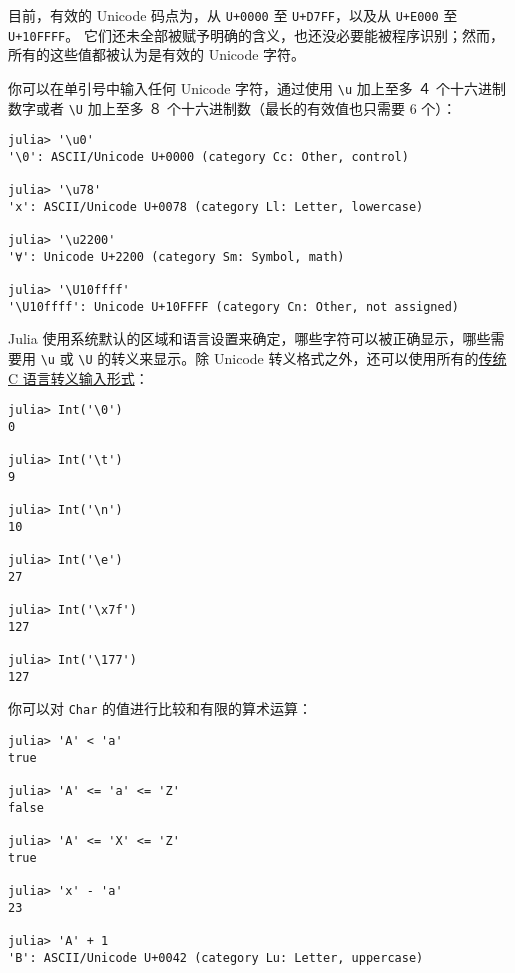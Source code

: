目前，有效的 Unicode 码点为，从 \texttt{U+0000} 至 \texttt{U+D7FF}，以及从 \texttt{U+E000} 至 \texttt{U+10FFFF}。 它们还未全部被赋予明确的含义，也还没必要能被程序识别；然而，所有的这些值都被认为是有效的 Unicode 字符。



你可以在单引号中输入任何 Unicode 字符，通过使用 \texttt{{\textbackslash}u} 加上至多 ４ 个十六进制数字或者 \texttt{{\textbackslash}U} 加上至多 ８ 个十六进制数（最长的有效值也只需要 6 个）：




\begin{verbatim}
julia> '\u0'
'\0': ASCII/Unicode U+0000 (category Cc: Other, control)

julia> '\u78'
'x': ASCII/Unicode U+0078 (category Ll: Letter, lowercase)

julia> '\u2200'
'∀': Unicode U+2200 (category Sm: Symbol, math)

julia> '\U10ffff'
'\U10ffff': Unicode U+10FFFF (category Cn: Other, not assigned)
\end{verbatim}



Julia 使用系统默认的区域和语言设置来确定，哪些字符可以被正确显示，哪些需要用 \texttt{{\textbackslash}u} 或 \texttt{{\textbackslash}U} 的转义来显示。除 Unicode 转义格式之外，还可以使用所有的\href{https://en.wikipedia.org/wiki/C\_syntax\#Backslash\_escapes}{传统 C 语言转义输入形式}：




\begin{verbatim}
julia> Int('\0')
0

julia> Int('\t')
9

julia> Int('\n')
10

julia> Int('\e')
27

julia> Int('\x7f')
127

julia> Int('\177')
127
\end{verbatim}



你可以对 \texttt{Char} 的值进行比较和有限的算术运算：




\begin{verbatim}
julia> 'A' < 'a'
true

julia> 'A' <= 'a' <= 'Z'
false

julia> 'A' <= 'X' <= 'Z'
true

julia> 'x' - 'a'
23

julia> 'A' + 1
'B': ASCII/Unicode U+0042 (category Lu: Letter, uppercase)
\end{verbatim}



